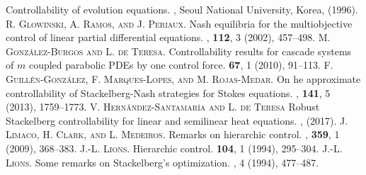 \documentclass[preprint,10pt]{article}
\numberwithin{equation}{section}
\numberwithin{theorem}{section}
\begin{document}
{\begin{thebibliography}{7}
\newblock Controllability of evolution equations.
, Seoul National University, Korea, (1996).
%
\textsc{R. Glowinski, A. Ramos, and J. Periaux.}
\newblock Nash equilibria for the multiobjective control of linear partial
  differential equations.
, \textbf{112}, 3 (2002), 457--498.
%
\textsc{M. Gonz\'alez-Burgos and L. de Teresa.}
\newblock Controllability results for cascade systems of $m$ coupled parabolic PDEs by one control force.
 \textbf{67}, 1 (2010), 91--113.
%
\textsc{F. Guill\'en-Gonz\'alez, F. Marques-Lopes, and M. Rojas-Medar.}
\newblock On he approximate controllability of {S}tackelberg-{N}ash strategies
  for {S}tokes equations.
, \textbf{141}, 5 (2013),
  1759--1773.
\textsc{V. Hern\'andez-Santamar\'ia and L. de Teresa}
\newblock Robust Stackelberg controllability for linear and semilinear heat equations.
, (2017).
%
\textsc{J. Limaco, H. Clark, and L. Medeiros.}
\newblock Remarks on hierarchic control.
, \textbf{359}, 1
  (2009), 368--383.
%
%
\textsc{J.-L. Lions.}
\newblock Hierarchic control.
 \textbf{104}, 1 (1994), 295--304.
%
\textsc{J.-L. Lions.}
\newblock Some remarks on {S}tackelberg's optimization.
, 4
  (1994), 477--487.
%

\end{thebibliography}}
\end{document}
